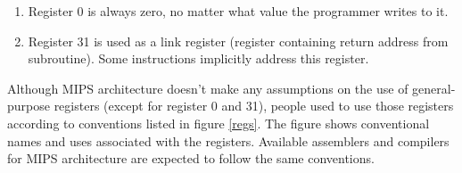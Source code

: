 \documentclass[oneside]{book}
\begin{document}
\begin{enumerate}

\item Register 0 is always zero, no matter what value the programmer
      writes to it.

\item Register 31 is used as a link register (register containing
      return address from subroutine). Some instructions implicitly
      address this register.

\end{enumerate}

Although MIPS architecture doesn't make any assumptions on the use
of general-purpose registers (except for register 0 and 31), people
used to use those registers according to conventions listed in
figure \ref{regs}. The figure shows conventional names and uses
associated with the registers. Available assemblers and compilers
for MIPS architecture are expected to follow the same conventions.
\end{document}
